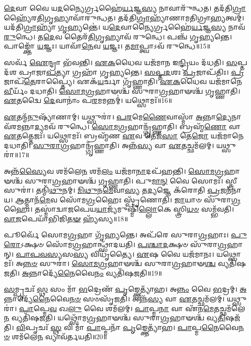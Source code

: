 \-\ul{𑌦𑍇}\-𑌵𑌾 𑌵𑍈 𑌯\-\ul{𑌦}\-𑌨𑍍𑌯𑍈𑌰𑍍𑌗𑍍𑌰𑌹𑍈॑\-\ul{𑌰𑍍𑌯}\-𑌜𑍍𑌞\-\ul{𑌸𑍍𑌯} 𑌨𑌾𑌵𑌾𑌰𑍁᳴𑌨𑍍𑌧𑌤।
𑌤𑌦᳴𑌤𑌿\-\ul{𑌗𑍍𑌰𑌾}\-𑌹𑍍𑌯𑍈᳴𑌰\-\ul{𑌤𑌿}\-\-𑌗𑍃𑌹𑍍𑌯𑌾\-𑌵𑌾᳴𑌰𑍁𑌨𑍍𑌧𑌤।
𑌤𑌦᳴𑌤𑌿\-\ul{𑌗𑍍𑌰𑌾}\-𑌹𑍍𑌯𑌾᳴𑌣𑌾𑌮𑌤𑌿𑌗𑍍𑌰𑌾\-\ul{𑌹𑍍𑌯}\-𑌤𑍍𑌵𑌮𑍍।
𑌯𑌦᳴𑌤𑌿\-\ul{𑌗𑍍𑌰𑌾}\-𑌹𑍍𑌯𑌾᳴ \ul{𑌗𑍃}\-𑌹𑍍𑌯𑌨𑍍𑌤𑍇॑।
𑌯\-\ul{𑌦𑍇}\-𑌵𑌾𑌨𑍍𑌯𑍈𑌰𑍍𑌗𑍍𑌰𑌹𑍈॑\-\ul{𑌰𑍍𑌯}\-𑌜𑍍𑌞\-\ul{𑌸𑍍𑌯} 𑌨𑌾𑌵᳴ \ul{𑌰𑍁}\-𑌨𑍍𑌧𑍇।
𑌤\-\ul{𑌦𑍇}\-𑌵 𑌤𑍈𑌰᳴\-\ul{𑌤𑌿}\-𑌗𑍃𑌹𑍍𑌯𑌾\-𑌵᳴ 𑌰𑍁𑌨𑍍𑌧𑍇।
𑌪𑌞𑍍𑌚᳴ 𑌗𑍃𑌹𑍍𑌯𑌨𑍍𑌤𑍇।
𑌪𑌾𑌙𑍍𑌕𑍍𑌤𑍋᳴ \ul{𑌯}\-𑌜𑍍𑌞𑌃।
𑌯𑌾𑌵𑌾᳴\-\ul{𑌨𑍇}\-𑌵 \ul{𑌯}\-𑌜𑍍𑌞𑌃।
𑌤\-\ul{𑌮𑌾}\-𑌪𑍍𑌤𑍍𑌵𑌾\-𑌽𑌵᳴ 𑌰𑍁𑌨𑍍𑌧𑍇॥15॥

𑌸𑌰𑍍𑌵᳴ \ul{𑌐}\-𑌨𑍍𑌦𑍍𑌰𑌾 𑌭᳴𑌵𑌨𑍍𑌤𑌿।
\-\ul{𑌏}\-\-\ul{𑌕}\-𑌧𑍈𑌵 𑌯𑌜᳴𑌮𑌾𑌨 𑌇\-\ul{𑌨𑍍𑌦𑍍𑌰𑌿}\-𑌯𑌂 𑌦᳴𑌧𑌤𑌿।
\-\ul{𑌸}\-𑌪𑍍𑌤𑌦᳴𑌶 𑌪𑍍𑌰𑌾𑌜𑌾\-\ul{𑌪}\-𑌤𑍍𑌯𑌾 𑌗𑍍𑌰𑌹𑌾᳴ 𑌗𑍃𑌹𑍍𑌯𑌨𑍍𑌤𑍇।
\-\ul{𑌸}\-\-\ul{𑌪𑍍𑌤}\-\-\ul{𑌦}\-𑌶𑌃 \ul{𑌪𑍍𑌰}\-𑌜𑌾\-𑌪᳴𑌤𑌿𑌃।
\-\ul{𑌪𑍍𑌰}\-𑌜𑌾𑌪᳴\-\ul{𑌤𑍇}\-𑌰𑌾𑌪𑍍𑌤𑍍𑌯𑍈॑।
𑌏𑌕᳴\-\ul{𑌯}\-𑌰𑍍𑌚𑌾 𑌗𑍃᳴𑌹𑍍𑌣𑌾𑌤𑌿।
\-\ul{𑌏}\-\-\ul{𑌕}\-𑌧𑍈𑌵 𑌯𑌜᳴𑌮𑌾𑌨𑍇 \ul{𑌵𑍀}\-𑌰𑍍𑌯𑌂᳴ 𑌦𑌧𑌾𑌤𑌿।
\-\ul{𑌸𑍋}\-\-\ul{𑌮}\-\-\ul{𑌗𑍍𑌰}\-𑌹𑌾𑍟𑌶𑍍𑌚᳴ 𑌸𑍁𑌰𑌾\-\ul{𑌗𑍍𑌰}\-𑌹𑌾𑍟𑌶𑍍𑌚᳴ 𑌗𑍃𑌹𑍍𑌣𑌾𑌤𑌿।
\-\ul{𑌏}\-𑌤𑌦𑍍𑌵𑍈 \ul{𑌦𑍇}\-𑌵𑌾𑌨𑌾𑌂॑ 𑌪\-\ul{𑌰}\-𑌮𑌮𑌨𑍍𑌨𑌮𑍍॑।
𑌯𑌥𑍍𑌸𑍋𑌮𑌃᳴॥16॥

\-\ul{𑌏}\-𑌤𑌨𑍍𑌮᳴\-\ul{𑌨𑍁}\-𑌷𑍍𑌯𑌾᳴𑌣𑌾𑌮𑍍।
𑌯𑌥𑍍𑌸𑍁𑌰𑌾॑।
\-\ul{𑌪}\-\-\ul{𑌰}\-𑌮𑍇\-\ul{𑌣𑍈}\-𑌵𑌾𑌸𑍍𑌮𑌾᳴ \ul{𑌅}\-𑌨𑍍𑌨𑌾\-\ul{𑌦𑍍𑌯𑍇}\-𑌨𑌾𑌵᳴𑌰\-\-\ul{𑌮}\-𑌨𑍍𑌨𑌾\-\ul{𑌦𑍍𑌯}\-𑌮𑌵᳴ 𑌰𑍁𑌨𑍍𑌧𑍇।
\-\ul{𑌸𑍋}\-\-\ul{𑌮}\-\-\ul{𑌗𑍍𑌰}\-𑌹𑌾𑌨𑍍𑌗𑍃᳴𑌹𑍍𑌣𑌾𑌤𑌿।
𑌬𑍍𑌰𑌹𑍍𑌮᳴\-\ul{𑌣𑍋} 𑌵𑌾 \ul{𑌏}\-𑌤𑌤𑍍𑌤𑍇𑌜𑌃᳴।
𑌯𑌥𑍍𑌸𑍋𑌮𑌃᳴।
𑌬𑍍𑌰𑌹𑍍𑌮᳴𑌣 \ul{𑌏}\-𑌵 𑌤𑍇𑌜᳴\-\ul{𑌸𑌾} 𑌤𑍇\-\ul{𑌜𑍋} 𑌯𑌜᳴𑌮𑌾𑌨𑍇 𑌦𑌧𑌾𑌤𑌿।
\-\ul{𑌸𑍁}\-\-\ul{𑌰𑌾}\-\-\ul{𑌗𑍍𑌰}\-𑌹𑌾𑌨𑍍𑌗𑍃᳴𑌹𑍍𑌣𑌾𑌤𑌿।
𑌅𑌨𑍍𑌨᳴\-\ul{𑌸𑍍𑌯} 𑌵𑌾 \ul{𑌏}\-𑌤𑌚𑍍𑌛𑌮᳴𑌲𑌮𑍍।
𑌯𑌥𑍍𑌸𑍁𑌰𑌾॑॥17॥

𑌅𑌨𑍍𑌨᳴\-\ul{𑌸𑍍𑌯𑍈}\-𑌵 𑌶𑌮᳴𑌲𑍇\-\ul{𑌨} 𑌶𑌮᳴\-\ul{𑌲𑌂} 𑌯𑌜᳴𑌮𑌾\-\ul{𑌨𑌾}\-𑌦𑌪᳴𑌹𑌨𑍍𑌤𑌿।
\-\ul{𑌸𑍋}\-\-\ul{𑌮}\-\-\ul{𑌗𑍍𑌰}\-𑌹𑌾𑍟𑌶𑍍𑌚᳴ 𑌸𑍁𑌰𑌾\-\ul{𑌗𑍍𑌰}\-𑌹𑌾𑍟𑌶𑍍𑌚᳴ 𑌗𑍃𑌹𑍍𑌣𑌾𑌤𑌿।
𑌪𑍁\-\ul{𑌮𑌾}\-\-\ul{𑌨𑍍} 𑌵𑍈 𑌸𑍋𑌮𑌃᳴।
𑌸𑍍𑌤𑍍𑌰𑍀 𑌸𑍁𑌰𑌾॑।
𑌤𑌨𑍍𑌮𑌿᳴\-\ul{𑌥𑍁}\-𑌨𑌮𑍍।
\-\ul{𑌮𑌿}\-\-\ul{𑌥𑍁}\-𑌨\-\ul{𑌮𑍇}\-𑌵𑌾\-\ul{𑌸𑍍𑌯} 𑌤\-\ul{𑌦𑍍𑌯}\-𑌜𑍍𑌞𑍇 𑌕᳴𑌰𑍋𑌤𑌿 \ul{𑌪𑍍𑌰}\-𑌜𑌨᳴𑌨𑌾𑌯।
\-\ul{𑌆}\-𑌤𑍍𑌮𑌾𑌨᳴\-\ul{𑌮𑍇}\-𑌵 𑌸𑍋᳴𑌮\-\ul{𑌗𑍍𑌰}\-𑌹𑍈𑌃 𑌸𑍍𑌪𑍃᳴𑌣𑍋𑌤𑌿।
\-\ul{𑌜𑌾}\-𑌯𑌾𑍞 𑌸𑍁᳴𑌰𑌾\-\ul{𑌗𑍍𑌰}\-𑌹𑍈𑌃।
𑌤𑌸𑍍𑌮𑌾॑𑌦𑍍𑌵𑌾𑌜𑌪𑍇𑌯\-\ul{𑌯𑌾}\-𑌜𑍍𑌯᳴𑌮𑍁𑌷𑍍𑌮𑌿𑌁᳴\-\ul{𑌲𑍍𑌲𑍋}\-𑌕𑍇 𑌸𑍍𑌤𑍍𑌰𑌿\-\ul{𑌯}\-\-\ul{𑍞} 𑌸𑌮𑍍𑌭᳴𑌵𑌤𑌿।
\-\ul{𑌵𑌾}\-\-\ul{𑌜}\-𑌪𑍇𑌯𑌾᳴𑌭𑌿𑌜𑌿\-\ul{𑌤}\-\-\ul{𑍟} 𑌹𑍍𑌯᳴𑌸𑍍𑌯॥18॥

𑌪𑍂𑌰𑍍𑌵𑍇᳴ 𑌸𑍋𑌮\-\ul{𑌗𑍍𑌰}\-𑌹𑌾 𑌗𑍃᳴𑌹𑍍𑌯𑌨𑍍𑌤𑍇।
𑌅𑌪᳴𑌰𑍇 𑌸𑍁𑌰𑌾\-\ul{𑌗𑍍𑌰}\-𑌹𑌾𑌃।
\-\ul{𑌪𑍁}\-\-\ul{𑌰𑍋}\-\-𑌽𑌕𑍍𑌷𑍞 𑌸𑍋᳴𑌮\-\ul{𑌗𑍍𑌰}\-𑌹𑌾𑌨𑍍𑌥𑍍𑌸𑌾᳴𑌦𑌯𑌤𑌿।
\-\ul{𑌪}\-\-\ul{𑌶𑍍𑌚𑌾}\-\-\ul{𑌦}\-𑌕𑍍𑌷𑍞 𑌸𑍁᳴𑌰𑌾\-\ul{𑌗𑍍𑌰}\-𑌹𑌾𑌨𑍍।
\-\ul{𑌪𑌾}\-\-\ul{𑌪}\-\-\ul{𑌵}\-\-\ul{𑌸𑍍𑌯}\-𑌸\-\ul{𑌸𑍍𑌯} 𑌵𑌿𑌧𑍃᳴𑌤𑍍𑌯𑍈।
\-\ul{𑌏}\-𑌷 𑌵𑍈 𑌯𑌜᳴𑌮𑌾𑌨𑌃।
𑌯𑌥𑍍𑌸𑍋𑌮𑌃᳴।
𑌅\-\ul{𑌨𑍍𑌨}\-\-\ul{𑍞} 𑌸𑍁𑌰𑌾॑।
\-\ul{𑌸𑍋}\-\-\ul{𑌮}\-\-\ul{𑌗𑍍𑌰}\-𑌹𑌾𑍟𑌶𑍍𑌚᳴ 𑌸𑍁𑌰𑌾\-\ul{𑌗𑍍𑌰}\-𑌹𑌾𑍟\-\ul{𑌶𑍍𑌚} 𑌵𑍍𑌯𑌤𑌿᳴𑌷𑌜𑌤𑌿।
\-\ul{𑌅}\-𑌨𑍍𑌨𑌾𑌦𑍍𑌯𑍇᳴\-\ul{𑌨𑍈}\-𑌵𑍈\-\ul{𑌨𑌂} 𑌵𑍍𑌯𑌤𑌿᳴𑌷𑌜𑌤𑌿॥19॥

\-\ul{𑌸}\-𑌮𑍍𑌪𑍃𑌚𑌃᳴ \ul{𑌸𑍍𑌥} 𑌸𑌂 𑌮𑌾᳴ \ul{𑌭}\-𑌦𑍍𑌰𑍇𑌣᳴ \ul{𑌪𑍃}\-𑌙𑍍𑌕𑍍𑌤𑍇𑌤𑍍𑌯𑌾᳴𑌹।
𑌅\-\ul{𑌨𑍍𑌨𑌂} 𑌵𑍈 \ul{𑌭}\-𑌦𑍍𑌰𑌮𑍍।
\-\ul{𑌅}\-𑌨𑍍𑌨𑌾𑌦𑍍𑌯𑍇᳴\-\ul{𑌨𑍈}\-𑌵𑍈\-\ul{𑌨}\-\-\ul{𑍞} 𑌸𑍞𑌸𑍃᳴𑌜𑌤𑌿।
𑌅𑌨𑍍𑌨᳴\-\ul{𑌸𑍍𑌯} 𑌵𑌾 \ul{𑌏}\-𑌤𑌚𑍍𑌛𑌮᳴𑌲𑌮𑍍।
𑌯𑌥𑍍𑌸𑍁𑌰𑌾॑।
\-\ul{𑌪𑌾}\-𑌪𑍍𑌮𑍇\-\ul{𑌵} 𑌖\-\ul{𑌲𑍁} 𑌵𑍈 𑌶𑌮᳴𑌲𑌮𑍍।
\-\ul{𑌪𑌾}\-𑌪𑍍𑌮\-\ul{𑌨𑌾} 𑌵𑌾 𑌏᳴𑌨\-\ul{𑌮𑍇}\-𑌤𑌚𑍍𑌛𑌮᳴𑌲𑍇\-\ul{𑌨} 𑌵𑍍𑌯𑌤𑌿᳴𑌷𑌜𑌤𑌿।
𑌯𑌥𑍍𑌸𑍋᳴𑌮\-\ul{𑌗𑍍𑌰}\-𑌹𑌾𑍟𑌶𑍍𑌚᳴ 𑌸𑍁𑌰𑌾\-\ul{𑌗𑍍𑌰}\-𑌹𑌾𑍟𑌶𑍍𑌚᳴ 𑌵𑍍𑌯\-\ul{𑌤𑌿}\-𑌷𑌜᳴𑌤𑌿।
\-\ul{𑌵𑌿}\-𑌪𑍃𑌚𑌃᳴ \ul{𑌸𑍍𑌥} 𑌵𑌿 𑌮𑌾᳴ \ul{𑌪𑌾}\-𑌪𑍍𑌮𑌨𑌾᳴ \ul{𑌪𑍃}\-𑌙𑍍𑌕𑍍𑌤𑍇𑌤𑍍𑌯𑌾᳴𑌹।
\-\ul{𑌪𑌾}\-𑌪𑍍𑌮\-\ul{𑌨𑍈}\-𑌵𑍈\-\ul{𑌨}\-\-\ul{𑍞} 𑌶𑌮᳴𑌲𑍇\-\ul{𑌨} 𑌵𑍍𑌯𑌾𑌵᳴𑌰𑍍𑌤𑌯𑌤𑌿॥20॥

